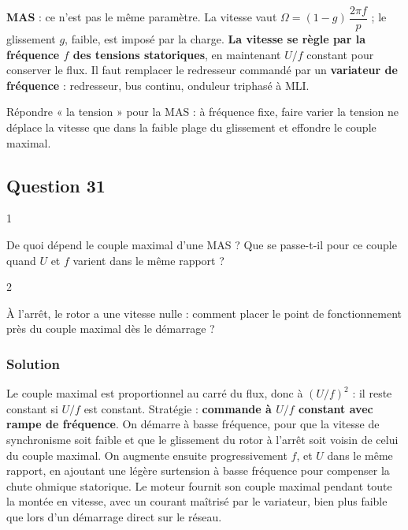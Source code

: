 \documentclass[11pt,a4paper]{article}
\begin{document}
\textbf{MAS} : ce n'est pas le même paramètre. La vitesse vaut \(\Omega=(1-g)\,\dfrac{2\pi f}p\) ; le glissement \(g\), faible, est imposé par la charge. \textbf{La vitesse se règle par la fréquence \(f\) des tensions statoriques}, en maintenant \(U/f\) constant pour conserver le flux. Il faut remplacer le redresseur commandé par un \textbf{variateur de fréquence} : redresseur, bus continu, onduleur triphasé à MLI.

\begin{piege}

Répondre « la tension » pour la MAS : à fréquence fixe, faire varier la tension ne déplace la vitesse que dans la faible plage du glissement et effondre le couple maximal.

\end{piege}

\hypertarget{question-31}{%
\subsection{Question 31}\label{question-31}}

\begin{indication}{1}

De quoi dépend le couple maximal d'une MAS ? Que se passe-t-il pour ce couple quand \(U\) et \(f\) varient dans le même rapport ?

\end{indication}

\begin{indication}{2}

À l'arrêt, le rotor a une vitesse nulle : comment placer le point de fonctionnement près du couple maximal dès le démarrage ?

\end{indication}

\hypertarget{solution-30}{%
\subsubsection{Solution}\label{solution-30}}

Le couple maximal est proportionnel au carré du flux, donc à \((U/f)^2\) : il reste constant si \(U/f\) est constant. Stratégie : \textbf{commande à \(U/f\) constant avec rampe de fréquence}. On démarre à basse fréquence, pour que la vitesse de synchronisme soit faible et que le glissement du rotor à l'arrêt soit voisin de celui du couple maximal. On augmente ensuite progressivement \(f\), et \(U\) dans le même rapport, en ajoutant une légère surtension à basse fréquence pour compenser la chute ohmique statorique. Le moteur fournit son couple maximal pendant toute la montée en vitesse, avec un courant maîtrisé par le variateur, bien plus faible que lors d'un démarrage direct sur le réseau.
\end{document}

